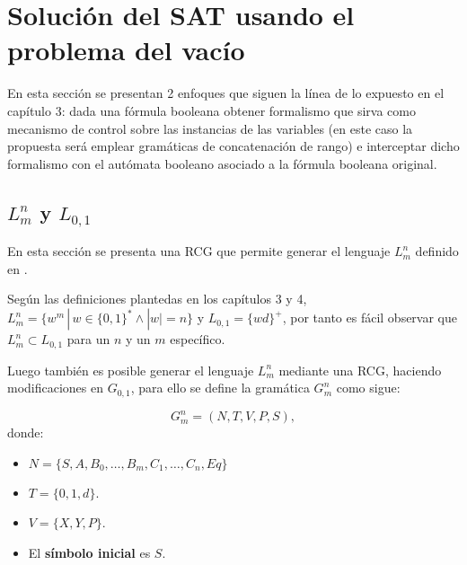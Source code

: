\documentclass[12pt]{article}
\begin{document}
\section{Solución del SAT usando el problema del vacío}

En esta sección se presentan 2 enfoques que siguen la línea de lo expuesto en el capítulo 3: dada una fórmula booleana
obtener formalismo que sirva como mecanismo de control sobre las instancias de las variables (en este caso la propuesta será emplear gramáticas
de concatenación de rango) e interceptar dicho formalismo con el autómata booleano asociado a la fórmula booleana
original.

\subsection{$L^n_m$ y $L_{0,1}$}

En esta sección se presenta una RCG que permite generar el lenguaje $L^n_m$ definido en \cite{aSMSAT}.

Según las definiciones plantedas en los capítulos 3 y 4, $L^n_m=\{w^m\,|\,w\in\{0,1\}^* \wedge |w|=n\}$ y $L_{0,1}=\{wd\}^+$, por tanto
es fácil observar que $L^n_m \subset L_{0,1}$ para un $n$ y un $m$ específico.

Luego también es posible generar el lenguaje $L^n_m$ mediante una RCG, haciendo modificaciones en $G_{0,1}$, para ello
se define la gramática $G^n_m$ como sigue:

\[
    G^n_m = (N, T, V, P, S),
\]
donde:

\begin{itemize}
    \item $N=\{S,A,B_0,\ldots,B_m,C_1,\ldots,C_n,Eq\}$
    \item $T=\{0,1,d\}$.
    \item $V=\{X,Y,P\}$.
    \item El \textbf{símbolo inicial} es $S$.
\end{itemize}
\end{document}
